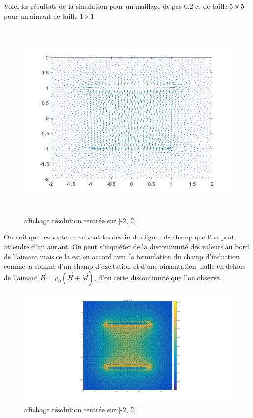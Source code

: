 \documentclass[a4paper,12pt,titlepage]{report}
\begin{document}
\begin{onehalfspace}
Voici les résultats de la simulation pour un maillage de pas 0.2 et de taille $5 \times 5$ pour un aimant de taille $1 \times 1$
\begin{figure}[!h]
\begin{center}
\includegraphics[height = 10cm, keepaspectratio]{graphes/resultat_champ.jpg}
\caption{affichage résolution centrée sur [-2, 2]}
\label{figure 1}
\end{center}
\end{figure}
On voit que les vecteurs suivent les dessin des lignes de champ que l'on peut attendre d'un aimant.
On peut s'inquiéter de la discontinuité des valeurs au bord de l'aimant mais ce la est en accord avec la formulation du champ d'induction comme la somme d'un champ d'excitation et d'une aimantation, nulle en dehors de l'aimant $\vec{B}=\mu _{0}(\vec{H}+\vec{M})$, d'où cette discontinuité que l'on observe.
\begin{figure}[!h]
\begin{center}
\includegraphics[height = 8 cm, keepaspectratio]{graphes/norme_du_champ.jpg}
\caption{affichage résolution centrée sur [-2, 2]}
\label{figure 1}
\end{center}
\end{figure}
\newpage

\end{onehalfspace}
\end{document}
